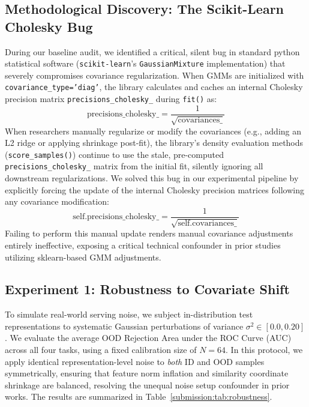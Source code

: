 \subsection{Methodological Discovery: The Scikit-Learn Cholesky Bug}
During our baseline audit, we identified a critical, silent bug in standard python statistical software (\texttt{scikit-learn}'s \texttt{GaussianMixture} implementation) that severely compromises covariance regularization. When GMMs are initialized with \texttt{covariance\_type='diag'}, the library calculates and caches an internal Cholesky precision matrix \texttt{precisions\_cholesky\_} during \texttt{fit()} as:
\begin{equation}
    \text{precisions\_cholesky\_} = \frac{1}{\sqrt{\text{covariances\_}}}
\end{equation}
When researchers manually regularize or modify the covariances (e.g., adding an L2 ridge or applying shrinkage post-fit), the library's density evaluation methods (\texttt{score\_samples()}) continue to use the stale, pre-computed \texttt{precisions\_cholesky\_} matrix from the initial fit, silently ignoring all downstream regularizations. 
We solved this bug in our experimental pipeline by explicitly forcing the update of the internal Cholesky precision matrices following any covariance modification:
\begin{equation}
    \text{self.precisions\_cholesky\_} = \frac{1}{\sqrt{\text{self.covariances\_}}}
\end{equation}
Failing to perform this manual update renders manual covariance adjustments entirely ineffective, exposing a critical technical confounder in prior studies utilizing sklearn-based GMM adjustments.

\subsection{Experiment 1: Robustness to Covariate Shift}
To simulate real-world serving noise, we subject in-distribution test representations to systematic Gaussian perturbations of variance $\sigma^2 \in [0.0, 0.20]$. We evaluate the average OOD Rejection Area under the ROC Curve (AUC) across all four tasks, using a fixed calibration size of $N=64$. In this protocol, we apply identical representation-level noise to {\em both} ID and OOD samples symmetrically, ensuring that feature norm inflation and similarity coordinate shrinkage are balanced, resolving the unequal noise setup confounder in prior works. The results are summarized in Table~\ref{submission:tab:robustness}.

